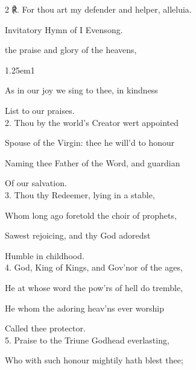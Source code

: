 \begin{paracol}{2}
℟. For thou art my defender and helper, alleluia.


\switchcolumn

\mattins

\begin{rubric}
	Invitatory Hymn of I Evensong.
\end{rubric}


\mattinsOfficeHymn\label{PatronageMattins}

 the praise and glory of the heavens,


\begin{hangparas}{1.25em}{1}

As in our joy we sing to thee, in kindness

List to our praises.\\

2. Thou by the world’s Creator wert appointed

    Spouse of the Virgin: thee he will'd to honour
    
    Naming thee Father of the Word, and guardian
    
       Of our salvation.\\

3. Thou thy Redeemer, lying in a stable,

    Whom long ago foretold the choir of prophets,
    
    Sawest rejoicing, and thy God adoredst
    
       Humble in childhood.\\

4. God, King of Kings, and Gov'nor of the ages,

    He at whose word the pow'rs of hell do tremble,
    
    He whom the adoring heav'ns ever worship
    
       Called thee protector.\\
       
5. Praise to the Triune Godhead everlasting,

    Who with such honour mightily hath blest thee;
    

\end{hangparas}
\end{paracol}
